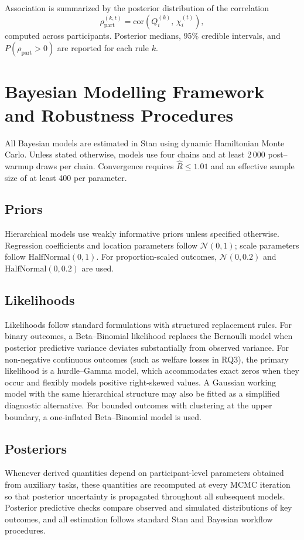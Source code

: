 \documentclass[11pt,a4paper]{article}
\numberwithin{equation}{section}
\begin{document}
Association is summarized by the posterior distribution of the correlation
\[
\rho^{(k,t)}_{\mathrm{part}}
=
\mathrm{cor}\!\left(Q^{(k)}_{i},\,\chi_i^{(t)}\right),
\]
computed across participants.
Posterior medians, 95\% credible intervals, and $P(\rho_{\mathrm{part}}>0)$ are
reported for each rule $k$.


\appendix
\clearpage
\section{Bayesian Modelling Framework and Robustness Procedures}
\label{App:Modeling}


All Bayesian models are estimated in Stan using dynamic Hamiltonian Monte Carlo. 
Unless stated otherwise, models use four chains and at least 2\,000 post--warmup 
draws per chain. Convergence requires $\hat{R}\le 1.01$ and an effective sample 
size of at least 400 per parameter.

\subsection{Priors}
Hierarchical models use weakly informative priors unless specified otherwise. 
Regression coefficients and location parameters follow $\mathcal{N}(0,1)$; 
scale parameters follow $\mathrm{HalfNormal}(0,1)$. 
For proportion-scaled outcomes, $\mathcal{N}(0,0.2)$ and $\mathrm{HalfNormal}(0,0.2)$ 
are used.

\subsection{Likelihoods}
Likelihoods follow standard formulations with structured replacement rules.  
For binary outcomes, a Beta--Binomial likelihood replaces the Bernoulli model 
when posterior predictive variance deviates substantially from observed variance.  
For non-negative continuous outcomes (such as welfare losses in RQ3), the primary 
likelihood is a hurdle--Gamma model, which accommodates exact zeros when they 
occur and flexibly models positive right-skewed values.  
A Gaussian working model with the same hierarchical structure may also be fitted 
as a simplified diagnostic alternative.  
For bounded outcomes with clustering at the upper boundary, a one-inflated 
Beta--Binomial model is used.

\subsection{Posteriors}  
Whenever derived quantities depend on participant-level parameters obtained from 
auxiliary tasks, these quantities are recomputed at every MCMC iteration so that 
posterior uncertainty is propagated throughout all subsequent models.  
Posterior predictive checks compare observed and simulated distributions of key 
outcomes, and all estimation follows standard Stan and Bayesian workflow 
procedures.
\end{document}
